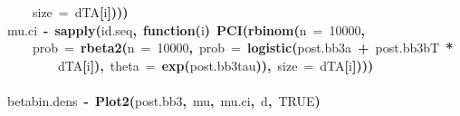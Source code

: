 \documentclass{article}
\makeatletter
\newcommand{\hlnumber}[1]{\textcolor[rgb]{0,0,0}{#1}}%
\newcommand{\hlfunctioncall}[1]{\textcolor[rgb]{.5,0,.33}{\textbf{#1}}}%
\newcommand{\hlkeyword}[1]{\textbf{#1}}%
\newcommand{\hlargument}[1]{\textcolor[rgb]{.69,.25,.02}{#1}}%
\newcommand{\hlformalargs}[1]{\hlargument{#1}}%
\newcommand{\hlassignement}[1]{\textbf{#1}}%
\newcommand{\hlsymbol}[1]{#1}%
\newcommand{\hlstd}[1]{\textcolor[rgb]{0,0,0}{#1}}%
\newenvironment{kframe}{%
 \def\FrameCommand##1{\hskip\@totalleftmargin \hskip-\fboxsep
 \colorbox{shadecolor}{##1}\hskip-\fboxsep
     \hskip-\linewidth \hskip-\@totalleftmargin \hskip\columnwidth}%
 \MakeFramed {\advance\hsize-\width
   \@totalleftmargin\z@ \linewidth\hsize
   \@setminipage}}%
 {\par\unskip\endMakeFramed}
\newenvironment{knitrout}{}{} %
\makeatother
\begin{document}
\begin{knitrout}
{\begin{kframe}
\begin{flushleft}
\hlstd{}{\ }{\ }{\ }{\ }\hlargument{size}{\ }\hlargument{=}{\ }\hlsymbol{d}\hlkeyword{\usebox{\hlnormalsizeboxdollar}}\hlsymbol{TA}\hlkeyword{[}\hlsymbol{i}\hlkeyword{]}\hlkeyword{)}\hlkeyword{)}\hlkeyword{)}\hspace*{\fill}\\
\hlstd{}\hlsymbol{mu.ci}{\ }\hlassignement{\usebox{\hlnormalsizeboxlessthan}-}{\ }\hlfunctioncall{sapply}\hlkeyword{(}\hlsymbol{id.seq}\hlkeyword{,}{\ }\hlkeyword{function}\hlkeyword{(}\hlformalargs{i}\hlkeyword{)}{\ }\hlfunctioncall{PCI}\hlkeyword{(}\hlfunctioncall{rbinom}\hlkeyword{(}\hlargument{n}{\ }\hlargument{=}{\ }\hlnumber{10000}\hlkeyword{,}\hspace*{\fill}\\
\hlstd{}{\ }{\ }{\ }{\ }\hlargument{prob}{\ }\hlargument{=}{\ }\hlfunctioncall{rbeta2}\hlkeyword{(}\hlargument{n}{\ }\hlargument{=}{\ }\hlnumber{10000}\hlkeyword{,}{\ }\hlargument{prob}{\ }\hlargument{=}{\ }\hlfunctioncall{logistic}\hlkeyword{(}\hlsymbol{post.bb3}\hlkeyword{\usebox{\hlnormalsizeboxdollar}}\hlsymbol{a}{\ }\hlkeyword{+}{\ }\hlsymbol{post.bb3}\hlkeyword{\usebox{\hlnormalsizeboxdollar}}\hlsymbol{bT}{\ }\hlkeyword{*}\hspace*{\fill}\\
\hlstd{}{\ }{\ }{\ }{\ }{\ }{\ }{\ }{\ }\hlsymbol{d}\hlkeyword{\usebox{\hlnormalsizeboxdollar}}\hlsymbol{TA}\hlkeyword{[}\hlsymbol{i}\hlkeyword{]}\hlkeyword{)}\hlkeyword{,}{\ }\hlargument{theta}{\ }\hlargument{=}{\ }\hlfunctioncall{exp}\hlkeyword{(}\hlsymbol{post.bb3}\hlkeyword{\usebox{\hlnormalsizeboxdollar}}\hlsymbol{tau}\hlkeyword{)}\hlkeyword{)}\hlkeyword{,}{\ }\hlargument{size}{\ }\hlargument{=}{\ }\hlsymbol{d}\hlkeyword{\usebox{\hlnormalsizeboxdollar}}\hlsymbol{TA}\hlkeyword{[}\hlsymbol{i}\hlkeyword{]}\hlkeyword{)}\hlkeyword{)}\hlkeyword{)}\hspace*{\fill}\\
\hlstd{}\hspace*{\fill}\\
\hlstd{}\hlsymbol{betabin.dens}{\ }\hlassignement{\usebox{\hlnormalsizeboxlessthan}-}{\ }\hlfunctioncall{Plot2}\hlkeyword{(}\hlsymbol{post.bb3}\hlkeyword{,}{\ }\hlsymbol{mu}\hlkeyword{,}{\ }\hlsymbol{mu.ci}\hlkeyword{,}{\ }\hlsymbol{d}\hlkeyword{,}{\ }\hlnumber{TRUE}\hlkeyword{)}\mbox{}
\normalfont
\end{flushleft}

\end{kframe}}
\end{knitrout}
\end{document}
